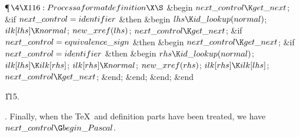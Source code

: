 \Y\P$\4\X116:Process a format definition\X\S$\6
\&{begin} $\\{next\_control}\K\\{get\_next}$;\6
\&{if} $\\{next\_control}=\\{identifier}$ \1\&{then}\6
\&{begin} $\\{lhs}\K\\{id\_lookup}(\\{normal})$;\5
$\\{ilk}[\\{lhs}]\K\\{normal}$;\5
$\\{new\_xref}(\\{lhs})$;\5
$\\{next\_control}\K\\{get\_next}$;\6
\&{if} $\\{next\_control}=\\{equivalence\_sign}$ \1\&{then}\6
\&{begin} $\\{next\_control}\K\\{get\_next}$;\6
\&{if} $\\{next\_control}=\\{identifier}$ \1\&{then}\6
\&{begin} $\\{rhs}\K\\{id\_lookup}(\\{normal})$;\5
$\\{ilk}[\\{lhs}]\K\\{ilk}[\\{rhs}]$;\5
$\\{ilk}[\\{rhs}]\K\\{normal}$;\5
$\\{new\_xref}(\\{rhs})$;\5
$\\{ilk}[\\{rhs}]\K\\{ilk}[\\{lhs}]$;\5
$\\{next\_control}\K\\{get\_next}$;\6
\&{end};\2\6
\&{end};\2\6
\&{end};\2\6
\&{end}\par
\U115.\fi

. Finally, when the \TeX\ and definition parts have been treated, we have
$\\{next\_control}\G\\{begin\_Pascal}$.

